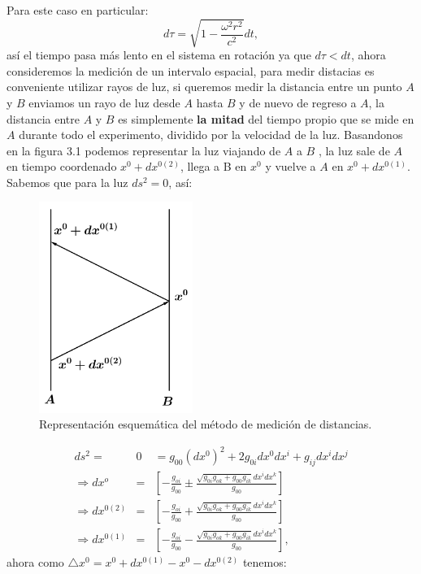Para este caso en particular:
\begin{equation}
d\tau=\sqrt{1-\frac{\omega^{2}r^{2}}{c^{2}}}dt,
\end{equation}
así el tiempo pasa más lento en el sistema en rotación ya que $d\tau<dt$, ahora consideremos la medición de un intervalo espacial, para medir distacias es conveniente utilizar rayos de luz, si queremos medir la distancia entre un punto $A$ y $B$ enviamos un rayo de luz desde $A$ hasta $B$ y de nuevo de regreso a $A$, la distancia entre $A$ y $B$ es simplemente \textbf{la mitad} del tiempo propio que se mide en $A$ durante todo el experimento, dividido por la velocidad de la luz. Basandonos en la figura 3.1 podemos representar la luz viajando de $A$ a $B$ , la luz sale de $A$ en tiempo coordenado $x^{0}+dx^{0(2)}$, llega a B en $x^0$ y vuelve a $A$ en $x^{0}+dx^{0(1)}$. Sabemos que para la luz $ds^2=0$, así:
\begin{figure}[h!]
\centering
\includegraphics[width=5cm]{Imagenes/Fig17}
\caption[Medición de distancias en sistemas de coordenadas no inerciales.]{Representación esquemática del método de medición de distancias.}
\end{figure}
\begin{eqnarray}
\nonumber ds^{2}=&0&=g_{00}(dx^{0})^{2}+2g_{0i}dx^{0}dx^{i}+g_{ij}dx^{i}dx^{j}\\
\nonumber \Rightarrow dx^{o}&=&\left[-\frac{g_{oi}}{g_{00}}\pm\frac{\sqrt{g_{0i}g_{ok}+g_{00}g_{ik}}dx^{i}dx^{k}}{g_{00}}\right]\\
\Rightarrow dx^{0(2)}&=&\left[-\frac{g_{oi}}{g_{00}}+\frac{\sqrt{g_{0i}g_{ok}+g_{00}g_{ik}}dx^{i}dx^{k}}{g_{00}}\right]\\
\Rightarrow dx^{0(1)}&=&\left[-\frac{g_{oi}}{g_{00}}-\frac{\sqrt{g_{0i}g_{ok}+g_{00}g_{ik}}dx^{i}dx^{k}}{g_{00}}\right],
\end{eqnarray} 
ahora como $\triangle x^0=x^0+dx^{0(1)}-x^0-dx^{0(2)}$ tenemos:
